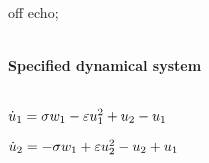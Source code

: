 
off echo;

\(\)
\paragraph{Specified dynamical system}
\(
\)\par
\(\dot u_{1}=\sigma  w_{1}-\varepsilon u_{1}^{2}+u_{2}-u_{1}
\)\par
\(\dot u_{2}=-\sigma  w_{1}+\varepsilon u_{2}^{2}-u_{2}+u_{1}
\)\par
